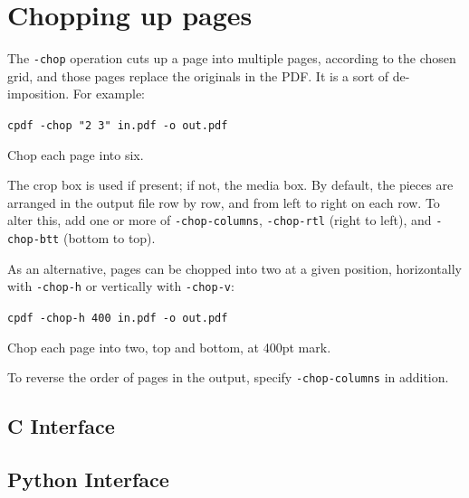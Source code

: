 \documentclass{book}
\begin{document}
\section{Chopping up pages}


The \texttt{-chop} operation cuts up a page into multiple pages, according to the chosen grid, and those pages replace the originals in the PDF. It is a sort of de-imposition. For example:

  \begin{framed}
    \noindent\small\verb!cpdf -chop "2 3" in.pdf -o out.pdf!
 
    \vspace{2.5mm}
    \noindent Chop each page into six.
  \end{framed}

\noindent The crop box is used if present; if not, the media box. By default, the pieces are arranged in the output file row by row, and from left to right on each row. To alter this, add one or more of \texttt{-chop-columns}, \texttt{-chop-rtl} (right to left), and \texttt{-chop-btt} (bottom to top).

As an alternative, pages can be chopped into two at a given position, horizontally with \texttt{-chop-h} or vertically with \texttt{-chop-v}:

  \begin{framed}
    \noindent\small\verb!cpdf -chop-h 400 in.pdf -o out.pdf!
 
    \vspace{2.5mm}
    \noindent Chop each page into two, top and bottom, at 400pt mark.
  \end{framed}

\noindent To reverse the order of pages in the output, specify \texttt{-chop-columns} in addition.

\begin{cpdflib}
\clearpage
\section*{C Interface}
\begin{small}\tt

\end{small}
\end{cpdflib}

\begin{pycpdflib}
\clearpage
\section*{Python Interface}
\begin{small}\tt

\end{small}
\end{pycpdflib}
\end{document}
